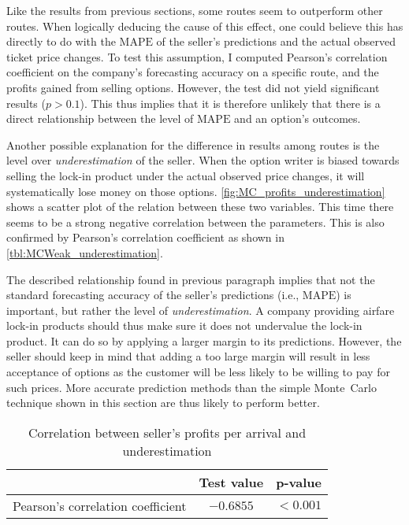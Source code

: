 Like the results from previous sections, some routes seem to outperform other routes. When logically deducing the cause of this effect, one could believe this has directly to do with the $\mbox{MAPE}$ of the seller's predictions and the actual observed ticket price changes. To test this assumption, I computed Pearson's correlation coefficient on the company's forecasting accuracy on a specific route, and the profits gained from selling options. However, the test did not yield significant results ($p > 0.1$). This thus implies that it is therefore unlikely that there is a direct relationship between the level of $\mbox{MAPE}$ and an option's outcomes.

Another possible explanation for the difference in results among routes is the level over \emph{underestimation} of the seller. When the option writer is biased towards selling the lock-in product under the actual observed price changes, it will systematically lose money on those options. \autoref{fig:MC_profits_underestimation} shows a scatter plot of the relation between these two variables. This time there seems to be a strong negative correlation between the parameters. This is also confirmed by Pearson's correlation coefficient as shown in \autoref{tbl:MCWeak_underestimation}.

The described relationship found in previous paragraph implies that not the standard forecasting accuracy of the seller's predictions (i.e., $\mbox{MAPE}$) is important, but rather the level of \emph{underestimation}. A company providing airfare lock-in products should thus make sure it does not undervalue the lock-in product. It can do so by applying a larger margin to its predictions. However, the seller should keep in mind that adding a too large margin will result in less acceptance of options as the customer will be less likely to be willing to pay for such prices. More accurate prediction methods than the simple Monte~Carlo technique shown in this section are thus likely to perform better.



\begin{table}
\centering
\begin{tabular}{l c c}
\toprule
~  &  Test value  &  p-value  \\
\midrule
Pearson's correlation coefficient   &  $-0.6855$   &  $< 0.001$ \\
\bottomrule
\end{tabular}
\caption{Correlation between seller's profits per arrival and underestimation}
\label{tbl:MCWeak_underestimation}
\end{table}

